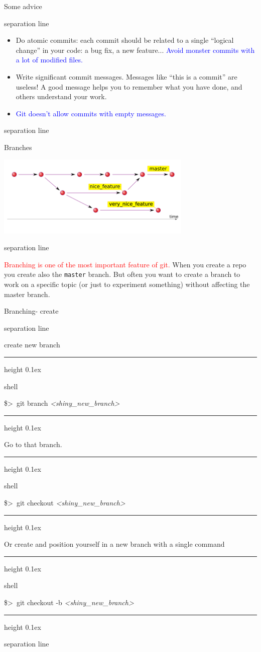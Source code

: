 \documentclass[hyperref={colorlinks}]{beamer}
\newenvironment{shell}{%
\footnotesize\flushleft\hrule height 0.1ex
\tt\begin{beamercolorbox}[sep=1ex,left]{shell}%
}{%
\end{beamercolorbox}
\hrule height 0.1ex
\endflushleft\par
}
\newcommand*{\psone}[1][ant]{\$>~}
\newcommand*{\var}[1]{{\it<#1>}}
\newcommand{\titleline}[1][0.025cm]{%
\begin{beamercolorbox}[wd=\paperwidth,ht=#1,center]{separation line}%
\end{beamercolorbox}%
}
\begin{document}
\begin{frame}{Some advice}
\titleline
\begin{itemize}
\item \alert{Do atomic commits}: each commit should be related to a single ``logical change'' in your code: a bug fix, a new feature... \textcolor{blue}{Avoid monster commits with a lot of modified files.}
\item \alert{Write significant commit messages}. Messages like ``this is a commit'' are useless! A good message helps you to remember what you have done, and others understand your work. 
\item \textcolor{blue}{Git doesn't allow commits with empty messages.}
\end{itemize}
\titleline
\end{frame}





\begin{frame}{Branches}
\centerline{\includegraphics[width=0.7\textwidth]{figures/git-history}}

\titleline

\textcolor{red}{Branching is one of the most important feature of git.} 
When you create a repo you create also the \alert{\texttt{master}} branch. But often you want to create a branch to work on a specific topic (or just to experiment something) without affecting the master branch.
\end{frame}
\begin{frame}{Branching- create}
\titleline
create new branch
\begin{shell}
\psone git branch \var{shiny_new_branch} \\
\end{shell}
Go to that branch.
\begin{shell}
\psone git checkout \var{shiny_new_branch}
\end{shell}
Or create and position yourself in a new branch with a single command
\begin{shell}
\psone git checkout -b \var{shiny_new_branch}
\end{shell}
\titleline
\end{frame}
\end{document}
